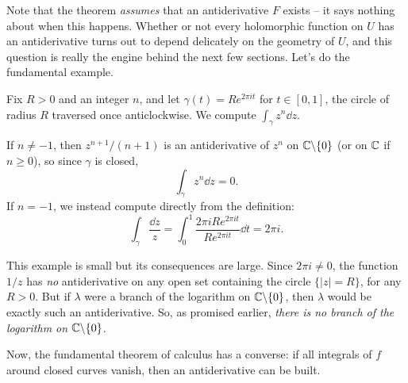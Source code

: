 \documentclass[a4paper]{scrartcl}
\begin{document}
Note that the theorem \emph{assumes} that an antiderivative $F$ exists -- it says nothing about when this happens. Whether or not every holomorphic function on $U$ has an antiderivative turns out to depend delicately on the geometry of $U$, and this question is really the engine behind the next few sections. Let's do the fundamental example.

\begin{example}
    Fix $R > 0$ and an integer $n$, and let $\gamma(t) = Re^{2\pi i t}$ for $t \in [0, 1]$, the circle of radius $R$ traversed once anticlockwise. We compute $\int_\gamma z^n \dd z$.

    If $n \neq -1$, then $z^{n + 1}/(n + 1)$ is an antiderivative of $z^n$ on $\mathbb{C} \backslash \{0\}$ (or on $\mathbb{C}$ if $n \geq 0$), so since $\gamma$ is closed,
    $$
    \int_\gamma z^n \dd z = 0.
    $$
    If $n = -1$, we instead compute directly from the definition:
    $$
    \int_\gamma \frac{\dd z}{z} = \int_0^1 \frac{2 \pi i R e^{2\pi i t}}{Re^{2 \pi i t}} \dd t = 2 \pi i.
    $$
\end{example}

This example is small but its consequences are large. Since $2\pi i \neq 0$, the function $1/z$ has \emph{no} antiderivative on any open set containing the circle $\{|z| = R\}$, for any $R > 0$. But if $\lambda$ were a branch of the logarithm on $\mathbb{C} \backslash \{0\}$, then $\lambda$ would be exactly such an antiderivative. So, as promised earlier, \emph{there is no branch of the logarithm on $\mathbb{C} \backslash \{0\}$}.

Now, the fundamental theorem of calculus has a converse: if all integrals of $f$ around closed curves vanish, then an antiderivative can be built.
\end{document}
